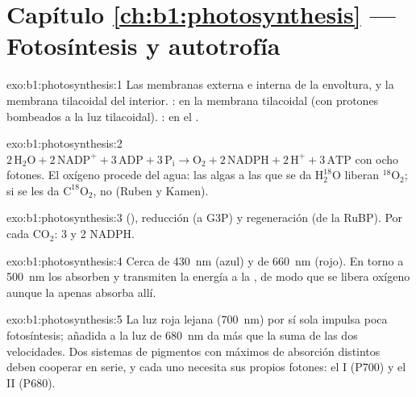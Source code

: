 \section*{Capítulo \ref{ch:b1:photosynthesis} --- Fotosíntesis y autotrofía}

\begin{solution}{exo:b1:photosynthesis:1}
Las membranas externa e interna de la envoltura, y la membrana tilacoidal
del interior. : en la membrana tilacoidal (con protones
bombeados a la luz tilacoidal). : en el .
\end{solution}

\begin{solution}{exo:b1:photosynthesis:2}
$2\,\mathrm{H_2O} + 2\,\mathrm{NADP^+} + 3\,\mathrm{ADP} + 3\,\mathrm{P_i}
\to \mathrm{O_2} + 2\,\mathrm{NADPH} + 2\,\mathrm{H^+} + 3\,\mathrm{ATP}$
con ocho fotones. El oxígeno procede del agua: las algas a las que se da
$\mathrm{H_2^{18}O}$ liberan $\mathrm{^{18}O_2}$; si se les da
$\mathrm{C^{18}O_2}$, no (Ruben y Kamen).
\end{solution}

\begin{solution}{exo:b1:photosynthesis:3}
 (), reducción (a G3P) y regeneración (de la RuBP). Por cada
$\mathrm{CO_2}$: 3  y 2 NADPH.
\end{solution}

\begin{solution}{exo:b1:photosynthesis:4}
Cerca de \qty{430}{nm} (azul) y de \qty{660}{nm} (rojo). En torno a
\qty{500}{nm} los  absorben y transmiten la energía a la
, de modo que se libera oxígeno aunque la  apenas absorba
allí.
\end{solution}

\begin{solution}{exo:b1:photosynthesis:5}
La luz roja lejana (\qty{700}{nm}) por sí sola impulsa poca fotosíntesis;
añadida a la luz de \qty{680}{nm} da más que la suma de las dos velocidades.
Dos sistemas de pigmentos con máximos de absorción distintos deben cooperar
en serie, y cada uno necesita sus propios fotones: el  I (P700) y
el  II (P680).
\end{solution}

